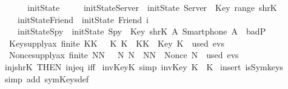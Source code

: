 \begin{isabellebody}
  \ \ \isanewline
  \ \ \isamarkupfalse%
  \ initState\ \isanewline
  \ \ \ \ initState{\isacharunderscore}Server\ {\isacharcolon}\ {\isachardoublequoteopen}initState\ Server\ {\isacharequal}\ {\isacharparenleft}Key{\isacharbackquote}\ {\isacharparenleft}range\ shrK{\isacharparenright}{\isacharparenright}{\isachardoublequoteclose}\ {\isacharbar}\isanewline
  \ \ \ \ initState{\isacharunderscore}Friend\ {\isacharcolon}\ {\isachardoublequoteopen}initState\ {\isacharparenleft}Friend\ i{\isacharparenright}\ {\isacharequal}\ {\isacharbraceleft}{\isacharbraceright}{\isachardoublequoteclose}\ {\isacharbar}\isanewline
  \ \ \ \ initState{\isacharunderscore}Spy\ {\isacharcolon}\ {\isachardoublequoteopen}initState\ Spy\ {\isacharequal}\ {\isacharparenleft}Key{\isacharbackquote}\ {\isacharparenleft}shrK{\isacharbackquote}\ {\isacharbraceleft}A{\isachardot}\ Smartphone\ A\ {\isasymin}\ badP{\isacharbraceright}{\isacharparenright}{\isacharparenright}{\isachardoublequoteclose}\isanewline
  \isamarkupfalse%
  \isanewline
  \isanewline
  \isamarkupfalse%
  \ \isanewline
  \ \ Key{\isacharunderscore}supply{\isacharunderscore}ax{\isacharcolon}\ {\isachardoublequoteopen}finite\ KK\ {\isasymLongrightarrow}\ {\isasymexists}\ K{\isachardot}\ K\ {\isasymnotin}\ KK\ {\isacharampersand}\ Key\ K\ {\isasymnotin}\ used\ evs\ {\isachardoublequoteclose}\ \isanewline
  \ \ \isanewline
  \ \ \isanewline
  \ \ Nonce{\isacharunderscore}supply{\isacharunderscore}ax{\isacharcolon}\ {\isachardoublequoteopen}finite\ NN\ {\isasymLongrightarrow}\ {\isasymexists}\ N{\isachardot}\ N\ {\isasymnotin}\ NN\ {\isacharampersand}\ Nonce\ N\ {\isasymnotin}\ used\ evs{\isachardoublequoteclose}\isanewline
  \isanewline
  \isanewline
  \isamarkupfalse%
  \ inj{\isacharunderscore}shrK\ {\isacharbrackleft}THEN\ inj{\isacharunderscore}eq{\isacharcomma}\ iff{\isacharbrackright}\isanewline
  \isanewline
  \isanewline
  \isamarkupfalse%
  \ invKey{\isacharunderscore}K\ {\isacharbrackleft}simp{\isacharbrackright}{\isacharcolon}\ {\isachardoublequoteopen}invKey\ K\ {\isacharequal}\ K{\isachardoublequoteclose}\isanewline
  \isadelimproof
  \endisadelimproof
  \isatagproof
  \isamarkupfalse%
  \ {\isacharparenleft}insert\ isSym{\isacharunderscore}keys{\isacharparenright}\isanewline
  \isamarkupfalse%
  \ {\isacharparenleft}simp\ add{\isacharcolon}\ symKeys{\isacharunderscore}def{\isacharparenright}\isanewline

\end{isabellebody}
